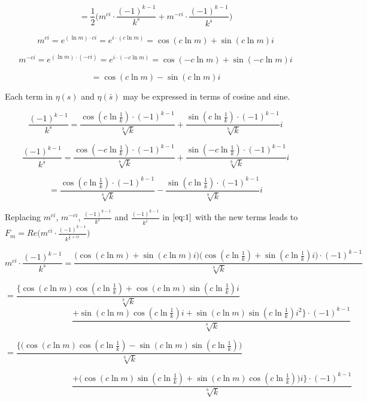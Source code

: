 \documentclass{amsart}
\begin{document}
	\begin{equation} = \frac{1}{2} \Big( m^{ci} {\cdot} \frac{(-1)^{k-1}}{k^{s}} + m^{-ci} {\cdot} \frac{(-1)^{k-1}}{k^{\bar{s}}} \label{eq:1}  \Big) \end{equation}
	
	\[\]
	\[ m^{ci} =  e^{(\ln m){\cdot}ci} = e^{i{\cdot}(c\ln m)} = \cos(c \ln m) + \sin(c \ln m) i \]
	
	\[ m^{-ci} =  e^{(\ln m){\cdot}(-ci)} = e^{i{\cdot}(-c\ln m)} = \cos(-c \ln m) + \sin(-c \ln m) i \]
	
	\[ = \cos(c \ln m) - \sin(c \ln m) i  \]
	\[\]
	
	Each term in $\eta(s)$ and $\eta(\bar{s})$ may be expressed in terms of cosine and sine.
	
	\[ \frac{(-1)^{k-1}}{k^s} = \frac{\cos(c \ln \frac{1}{k}){\cdot}(-1)^{k-1}}{\sqrt[b]{k}} + \frac{\sin(c \ln \frac{1}{k}){\cdot}(-1)^{k-1}}{\sqrt[b]{k}} i \]
	
	\[ \frac{(-1)^{k-1}}{k^{\bar{s}}} = \frac{\cos(-c \ln \frac{1}{k}){\cdot}(-1)^{k-1}}{\sqrt[b]{k}} + \frac{\sin(-c \ln \frac{1}{k}){\cdot}(-1)^{k-1}}{\sqrt[b]{k}} i \]
	
	\[ = \frac{\cos(c \ln \frac{1}{k}){\cdot}(-1)^{k-1}}{\sqrt[b]{k}} - \frac{\sin(c \ln \frac{1}{k}){\cdot}(-1)^{k-1}}{\sqrt[b]{k}} i \]
	\[\]
	
	Replacing $m^{ci}$, $m^{-ci}$, $\frac{(-1)^{k-1}}{k^s}$ and $\frac{(-1)^{k-1}}{k^{\bar{s}}}$ in $\eqref{eq:1}$ with the new terms leads to $F_m = Re \Big( m^{ci} \cdot \frac{(-1)^{k-1}}{k^{\frac{1}{b}+ci}} \Big)$
	
	\[ m^{ci} {\cdot} \frac{(-1)^{k-1}}{k^s} = \frac{\Big( \cos(c \ln m) {+} \sin(c \ln m) i \Big) \Big(\cos(c \ln \frac{1}{k}) {+} \sin(c \ln \frac{1}{k})i \Big) {\cdot} (-1)^{k-1} }{\sqrt[b]{k}} \]
	
	\[  = \frac{ \Big\{ \cos(c \ln m)\cos(c \ln \frac{1}{k}) {+} \cos(c \ln m)\sin(c \ln \frac{1}{k})i }{\sqrt[b]{k}} \qquad\qquad\qquad\qquad\qquad\qquad\qquad  \]
	\[ \qquad\qquad\qquad\qquad \frac{ {+} \sin(c \ln m)\cos(c \ln \frac{1}{k})i {+} \sin(c \ln m)\sin(c \ln \frac{1}{k})i^2 \Big\} {\cdot} (-1)^{k-1} }{\sqrt[b]{k}}   \]
	
	
	\[ = \frac{ \Big\{ \Big( \cos(c \ln m)\cos(c \ln \frac{1}{k}) - \sin(c \ln m)\sin(c \ln \frac{1}{k}) \Big) }{\sqrt[b]{k}} \qquad\qquad\qquad\qquad\qquad\qquad\qquad  \]
	
	\[ \qquad\qquad\qquad\qquad \frac{ {+} \Big( \cos(c \ln m)\sin(c \ln \frac{1}{k}) {+} \sin(c \ln m)\cos(c \ln \frac{1}{k}) \Big)i \Big\} {\cdot} (-1)^{k-1} }{\sqrt[b]{k}}   \]
	
\end{document}
